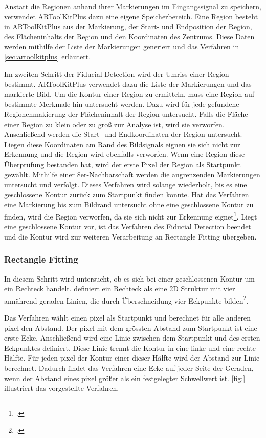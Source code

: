 Anstatt die Regionen anhand ihrer Markierungen im Eingangssignal zu speichern, verwendet ARToolKitPlus dazu eine eigene
 Speicherbereich. Eine Region besteht in ARToolKitPlus aus der Markierung, der Start- und Endposition der Region, des
 Flächeninhalts der Region und den Koordinaten des Zentrums. Diese Daten werden mithilfe der Liste der Markierungen
 generiert und das Verfahren in \autoref{sec:artoolkitplus} erläutert.

Im zweiten Schritt der Fiducial Detection wird der Umriss einer Region bestimmt. ARToolKitPlus verwendet dazu die Liste
 der Markierungen und das markierte Bild. Um die Kontur einer Region zu ermitteln, muss eine Region auf bestimmte
 Merkmale hin untersucht werden. Dazu wird für jede gefundene Regionenmakierung der Flächeninhalt der Region
 untersucht. Falls die Fläche einer Region zu klein oder zu groß zur Analyse ist, wird sie verworfen. Anschließend
 werden die Start- und Endkoordinaten der Region untersucht. Liegen diese Koordinaten am Rand des Bildsignals eignen
 sie sich nicht zur Erkennung und die Region wird ebenfalls verworfen. Wenn eine Region diese Überprüfung bestanden
 hat, wird der erste Pixel der Region als Startpunkt gewählt. Mithilfe einer 8er-Nachbarschaft werden die angrenzenden
 Markierungen untersucht und verfolgt. Dieses Verfahren wird solange wiederholt, bis es eine geschlossene Kontur zurück
 zum Startpunkt finden konnte. Hat das Verfahren eine Markierung bis zum Bildrand untersucht ohne eine geschlossene
 Kontur zu finden, wird die Region verworfen, da sie sich nicht zur Erkennung
 eignet\footcite[Vgl.][S.~41--42]{wagner07a}. Liegt eine geschlossene Kontur vor, ist das Verfahren des Fiducial
 Detection beendet und die Kontur wird zur weiteren Verarbeitung an Rectangle Fitting übergeben.


\subsubsection{Rectangle Fitting} %
\label{sub:rectangle_fitting}

In diesem Schritt wird untersucht, ob es sich bei einer geschlossenen Kontur um ein Rechteck handelt.
 \citeauthor{wagner07a} definiert ein Rechteck als eine 2D Struktur mit vier annährend geraden Linien, die durch
 Überschneidung vier Eckpunkte bilden\footcite[Vgl.][S.~42]{wagner07a}.

Das Verfahren wählt einen \gls{pixel} als Startpunkt und berechnet für alle anderen \gls{pixel} den Abstand. Der
 \gls{pixel} mit dem grössten Abstand zum Startpunkt ist eine erste Ecke. Anschließend wird eine Linie zwischen dem
 Startpunkt und des ersten Eckpunktes definiert. Diese Linie trennt die Kontur in eine linke und eine rechte Hälfte.
 Für jeden \gls{pixel} der Kontur einer dieser Hälfte wird der Abstand zur Linie berechnet. Dadurch findet das
 Verfahren eine Ecke auf jeder Seite der Geraden, wenn der Abstand eines \gls{pixel} größer als ein festgelegter
 Schwellwert ist. \autoref{fig:} illustriert das vorgestellte Verfahren.

